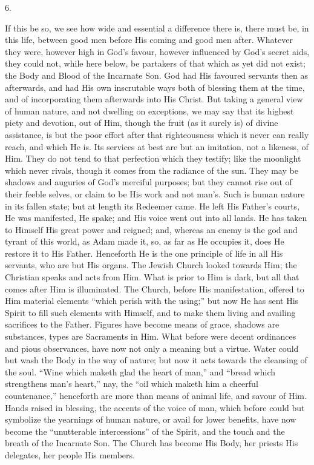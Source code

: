 6.

If this be so, we see how wide and essential a difference there is,
there must be, in this life, between good men before His coming and
good men after. Whatever they were, however high in God's favour,
however influenced by God's secret aids, they could not, while
here below, be partakers of that which as yet did not exist; the Body
and Blood of the Incarnate Son. God had His favoured servants then as
afterwards, and had His own inscrutable ways both of blessing them at
the time, and of incorporating them afterwards into His Christ. But
taking a general view of human nature, and not dwelling on exceptions,
we may say that its highest piety and devotion, out of Him, though the
fruit (as it surely is) of divine assistance, is but the poor effort
after that righteousness which it never can really reach, and which He
is. Its services at best are but an imitation, not a likeness, of Him.
They do not tend to that perfection which they testify; like the
moonlight which never rivals, though it comes from the radiance of the
sun. They may be shadows and auguries of God's merciful purposes; but
they cannot rise out of their feeble selves, or claim to be His work
and not man's. Such is human nature in its fallen state; but at length
its Redeemer came. He left His Father's courts, He was manifested, He
spake; and His voice went out into all lands. He has taken to Himself
His great power and reigned; and, whereas an enemy is the god and
tyrant of this world, as Adam made it, so, as far as He occupies it,
does He restore it to His Father. Henceforth He is the one principle
of life in all His servants, who are but His organs. The Jewish Church
looked towards Him; the Christian speaks and acts from Him. What is
prior to Him is dark, but all that comes after Him is illuminated. The
Church, before His manifestation, offered to Him material elements
``which perish with the using;'' but now He has sent His
Spirit to fill such elements with Himself, and to make them
living and availing sacrifices to the Father. Figures have become
means of grace, shadows are substances, types are Sacraments in Him.
What before were decent ordinances and pious observances, have now not
only a meaning but a virtue. Water could but wash the Body in the way
of nature; but now it acts towards the cleansing of the soul.
``Wine which maketh glad the heart of man,'' and ``bread
which strengthens man's heart,'' nay, the ``oil which maketh
him a cheerful countenance,'' henceforth are more than means of
animal life, and savour of Him. Hands raised in blessing, the accents
of the voice of man, which before could but symbolize the yearnings of
human nature, or avail for lower benefits, have now become the
``unutterable intercessions'' of the Spirit, and the touch and
the breath of the Incarnate Son. The Church has become His Body, her
priests His delegates, her people His members.

